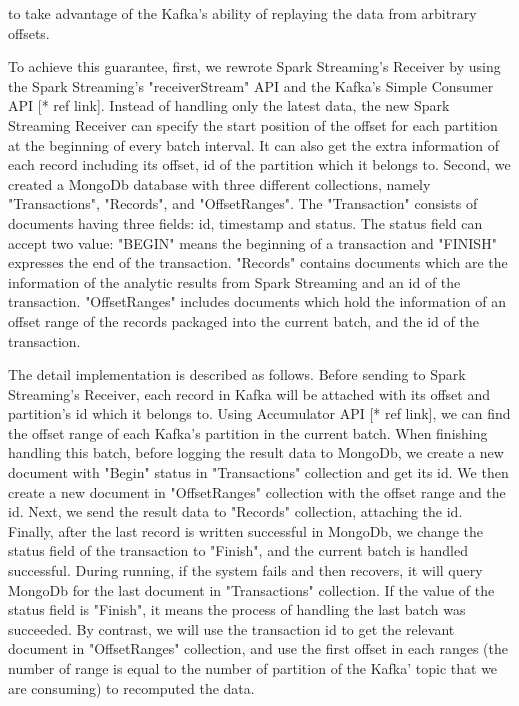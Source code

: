 \documentclass{acm_proc_article-sp}
\begin{document}
to take advantage of the Kafka's ability of replaying the data from arbitrary offsets.

To achieve this guarantee, first, we rewrote Spark Streaming's Receiver by using the Spark Streaming's "receiverStream" API and the Kafka's Simple Consumer API [* ref link]. Instead of handling only the latest data, the new Spark Streaming Receiver can specify the start position of the offset for each partition at the beginning of every batch interval. It can also get the extra information of each record including its offset, id of the partition which it belongs to. Second, we created a MongoDb database with three different collections, namely "Transactions", "Records", and "OffsetRanges". The "Transaction" consists of documents having three fields: id, timestamp and status. The status field can accept two value: "BEGIN" means the beginning of a transaction and "FINISH" expresses the end of the transaction. "Records" contains documents which are the information of the analytic results from Spark Streaming and an id of the transaction. "OffsetRanges" includes documents which hold the information of an offset range of the records packaged into the current batch, and the id of the transaction.

The detail implementation is described as follows. Before sending to Spark Streaming's Receiver, each record in Kafka will be attached with its offset and partition's id which it belongs to. Using Accumulator API [* ref link], we can find the offset range of each Kafka's partition in the current batch. When finishing handling this batch, before logging the result data to MongoDb, we create a new document with "Begin" status in "Transactions" collection and get its id. We then create a new document in "OffsetRanges" collection with the offset range and the id. Next, we send the result data to "Records" collection, attaching the id. Finally, after the last record is written successful in MongoDb, we change the status field of the transaction to "Finish", and the current batch is handled successful. During running, if the system fails and then recovers, it will query MongoDb for the last document in "Transactions" collection.  If the value of the status field is "Finish", it means the process of handling the last batch was succeeded. By contrast, we will use the transaction id to get the relevant document in "OffsetRanges" collection, and use the first offset in each ranges (the number of range is equal to the number of partition of the Kafka' topic that we are consuming) to recomputed the data. 
\end{document}
